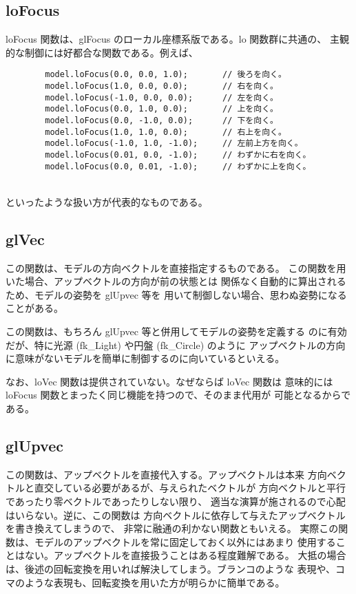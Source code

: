 \subsection{loFocus}
loFocus 関数は、glFocus のローカル座標系版である。lo 関数群に共通の、
主観的な制御には好都合な関数である。例えば、
\\
\begin{breakbox}
\begin{verbatim}
        model.loFocus(0.0, 0.0, 1.0);       // 後ろを向く。
        model.loFocus(1.0, 0.0, 0.0);       // 右を向く。
        model.loFocus(-1.0, 0.0, 0.0);      // 左を向く。
        model.loFocus(0.0, 1.0, 0.0);       // 上を向く。
        model.loFocus(0.0, -1.0, 0.0);      // 下を向く。
        model.loFocus(1.0, 1.0, 0.0);       // 右上を向く。
        model.loFocus(-1.0, 1.0, -1.0);     // 左前上方を向く。
        model.loFocus(0.01, 0.0, -1.0);     // わずかに右を向く。
        model.loFocus(0.0, 0.01, -1.0);     // わずかに上を向く。
\end{verbatim}
\end{breakbox}
~ \\
といったような扱い方が代表的なものである。
\subsection{glVec}
この関数は、モデルの方向ベクトルを直接指定するものである。
この関数を用いた場合、アップベクトルの方向が前の状態とは
関係なく自動的に算出されるため、モデルの姿勢を glUpvec 等を
用いて制御しない場合、思わぬ姿勢になることがある。

この関数は、もちろん glUpvec 等と併用してモデルの姿勢を定義する
のに有効だが、特に光源 (fk\_Light) や円盤 (fk\_Circle) のように
アップベクトルの方向に意味がないモデルを簡単に制御するのに向いているといえる。

なお、loVec 関数は提供されていない。なぜならば loVec 関数は
意味的には loFocus 関数とまったく同じ機能を持つので、そのまま代用が
可能となるからである。
\subsection{glUpvec}
この関数は、アップベクトルを直接代入する。アップベクトルは本来
方向ベクトルと直交している必要があるが、与えられたベクトルが
方向ベクトルと平行であったり零ベクトルであったりしない限り、
適当な演算が施されるので心配はいらない。逆に、この関数は
方向ベクトルに依存して与えたアップベクトルを書き換えてしまうので、
非常に融通の利かない関数ともいえる。
実際この関数は、モデルのアップベクトルを常に固定しておく以外にはあまり
使用することはない。アップベクトルを直接扱うことはある程度難解である。
大抵の場合は、後述の回転変換を用いれば解決してしまう。ブランコのような
表現や、コマのような表現も、回転変換を用いた方が明らかに簡単である。
